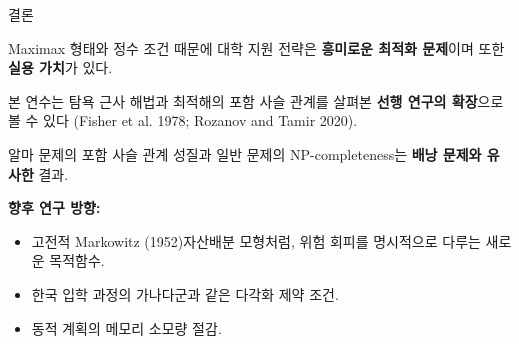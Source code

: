 \documentclass[10pt,slidestop,compress,mathserif,notheorems]{beamer}
\newif\ifen
\theoremstyle{definition}
\theoremstyle{definition}
\begin{document}
\begin{frame}{\ifen Conclusion\else 결론\fi}
\ifen {
Maximax form, integrality constraint make college application an \textbf{interesting optimization problem} with immediate \textbf{practical application}.

Our study \textbf{extends previous work} on greedy approximation algorithms and nestedness properties of optima (Fisher et al. 1978; Rozanov and Tamir 2020).%

Nestedness property for Alma's problem and the NP-completeness of the general problem is \textbf{analogous to knapsack}.

\textbf{Possible extensions} of our model:
\begin{itemize}
\item Explicit treatment of risk aversion as in the classic Markowitz (1952) model.
\item Diversification constraints like Korea's application fields.
\item Reduce memory usage of dynamic programs. 
\end{itemize}
} \else {
Maximax 형태와 정수 조건 때문에 대학 지원 전략은 \textbf{흥미로운 최적화 문제}이며 또한 \textbf{실용 가치}가 있다.

본 연수는 탐욕 근사 해법과 최적해의 포함 사슬 관계를 살펴본 \textbf{선행 연구의 확장}으로 볼 수 있다 (Fisher et al. 1978; Rozanov and Tamir 2020).%

알마 문제의 포함 사슬 관계 성질과 일반 문제의 NP-completeness는 \textbf{배낭 문제와 유사한} 결과.

\textbf{향후 연구 방향:}
\begin{itemize}
\item 고전적 Markowitz (1952)자산배분 모형처럼, 위험 회피를 명시적으로 다루는 새로운 목적함수.
\item 한국 입학 과정의 가나다군과 같은 다각화 제약 조건.
\item 동적 계획의 메모리 소모량 절감. 
\end{itemize}
} \fi
\end{frame}
\end{document}
